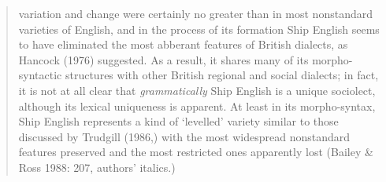 \begin{quotation}
variation and change were certainly no greater than in most nonstandard varieties of English, and in the process of its formation Ship English seems to have eliminated the most abberant features of British dialects, as Hancock (1976) suggested. As a result, it shares many of its morpho-syntactic structures with other British regional and social dialects; in fact, it is not at all clear that \textit{grammatically} Ship English is a unique sociolect, although its lexical uniqueness is apparent. At least in its morpho-syntax, Ship English represents a kind of ‘levelled’ variety similar to those discussed by Trudgill (1986,) with the most widespread nonstandard features preserved and the most restricted ones apparently lost (Bailey \& Ross 1988: 207, authors’ italics.) 

\end{quotation}
